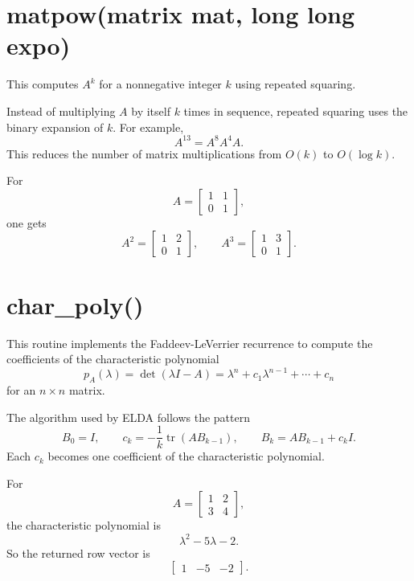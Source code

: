 \documentclass[11pt,a4paper,openany]{book}
\def\code#1{#1}%
\DeclareRobustCommand{\code}[1]{\texttt{\detokenize{#1}}}
\DeclareMathOperator{\tr}{tr}
\begin{document}
\section{\code{matpow(matrix mat, long long expo)}}
This computes \(A^k\) for a nonnegative integer \(k\) using repeated squaring.

\begin{mathbox}
Instead of multiplying \(A\) by itself \(k\) times in sequence, repeated squaring uses the binary expansion of \(k\). For example,
\[
A^{13} = A^{8}A^{4}A.
\]
This reduces the number of matrix multiplications from \(O(k)\) to \(O(\log k)\).
\end{mathbox}

\begin{examplebox}[Example]
For
\[
A =
\begin{bmatrix}
1 & 1 \\
0 & 1
\end{bmatrix},
\]
one gets
\[
A^2 =
\begin{bmatrix}
1 & 2 \\
0 & 1
\end{bmatrix},
\qquad
A^3 =
\begin{bmatrix}
1 & 3 \\
0 & 1
\end{bmatrix}.
\]
\end{examplebox}

\section{\code{char_poly()}}
This routine implements the Faddeev-LeVerrier recurrence to compute the coefficients of the characteristic polynomial
\[
p_A(\lambda) = \det(\lambda I - A)
= \lambda^n + c_1\lambda^{n-1} + \cdots + c_n
\]
for an \(n \times n\) matrix.

\begin{mathbox}
The algorithm used by ELDA follows the pattern
\[
B_0 = I,
\qquad
c_k = -\frac{1}{k}\tr(AB_{k-1}),
\qquad
B_k = AB_{k-1} + c_k I.
\]
Each \(c_k\) becomes one coefficient of the characteristic polynomial.
\end{mathbox}

\begin{examplebox}[Example]
For
\[
A =
\begin{bmatrix}
1 & 2 \\
3 & 4
\end{bmatrix},
\]
the characteristic polynomial is
\[
\lambda^2 - 5\lambda - 2.
\]
So the returned row vector is
\[
\begin{bmatrix}
1 & -5 & -2
\end{bmatrix}.
\]
\end{examplebox}
\end{document}
